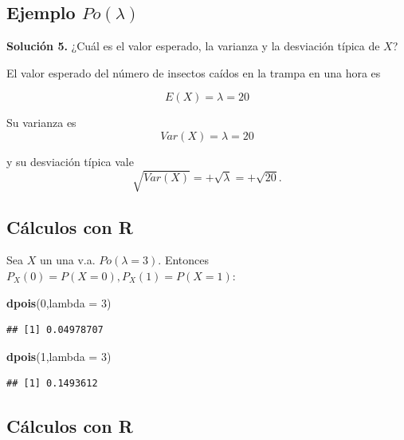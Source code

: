 \documentclass[]{book}
\newenvironment{Shaded}{\begin{snugshade}}{\end{snugshade}}
\newcommand{\DataTypeTok}[1]{\textcolor[rgb]{0.13,0.29,0.53}{#1}}
\newcommand{\DecValTok}[1]{\textcolor[rgb]{0.00,0.00,0.81}{#1}}
\newcommand{\KeywordTok}[1]{\textcolor[rgb]{0.13,0.29,0.53}{\textbf{#1}}}
\newcommand{\NormalTok}[1]{#1}
\begin{document}
\hypertarget{ejemplo-polambda-6}{%
\subsection{\texorpdfstring{Ejemplo \(Po(\lambda)\)}{Ejemplo Po(\textbackslash{}lambda)}}\label{ejemplo-polambda-6}}

\textbf{Solución 5.} ¿Cuál es el valor esperado, la varianza y la desviación típica de \(X\)?

El valor esperado del número de insectos caídos en la trampa en una hora es

\[E(X)=\lambda=20\]

Su varianza es
\[Var(X)=\lambda=20\]

y su desviación típica vale
\[\sqrt{Var(X)}=+\sqrt{\lambda}=+\sqrt{20}.\]

\hypertarget{cuxe1lculos-con-r-4}{%
\subsection{Cálculos con R}\label{cuxe1lculos-con-r-4}}

Sea \(X\) un una v.a. \(Po(\lambda=3)\). Entonces \(P_X(0)=P(X=0), P_X(1)=P(X=1)\):

\begin{Shaded}
\begin{Highlighting}[]
\KeywordTok{dpois}\NormalTok{(}\DecValTok{0}\NormalTok{,}\DataTypeTok{lambda =} \DecValTok{3}\NormalTok{)}
\end{Highlighting}
\end{Shaded}

\begin{verbatim}
## [1] 0.04978707
\end{verbatim}

\begin{Shaded}
\begin{Highlighting}[]
\KeywordTok{dpois}\NormalTok{(}\DecValTok{1}\NormalTok{,}\DataTypeTok{lambda =} \DecValTok{3}\NormalTok{)}
\end{Highlighting}
\end{Shaded}

\begin{verbatim}
## [1] 0.1493612
\end{verbatim}

\hypertarget{cuxe1lculos-con-r-5}{%
\subsection{Cálculos con R}\label{cuxe1lculos-con-r-5}}
\end{document}
